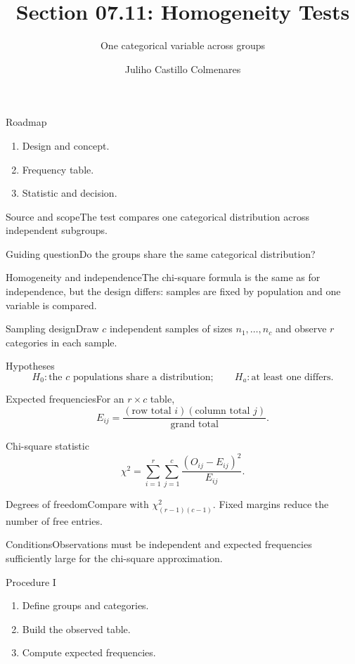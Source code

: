 \documentclass[10pt,aspectratio=169]{beamer}
\title[Homogeneity tests]{Section 07.11: Homogeneity Tests}\subtitle{One categorical variable across groups}
\author[J. Castillo Colmenares]{Juliho Castillo Colmenares}\institute{Tecnológico de Monterrey}\date{}
\begin{document}
\begin{frame}[plain]\titlepage\end{frame}
\begin{frame}{Roadmap}\small\begin{enumerate}\item Design and concept.\item Frequency table.\item Statistic and decision.\end{enumerate}\end{frame}
\begin{frame}{Source and scope}\small The test compares one categorical distribution across independent subgroups.\begin{block}{Guiding question}Do the groups share the same categorical distribution?\end{block}\end{frame}
\begin{frame}{Homogeneity and independence}\small The chi-square formula is the same as for independence, but the design differs: samples are fixed by population and one variable is compared.\end{frame}
\begin{frame}{Sampling design}\small Draw $c$ independent samples of sizes $n_1,\ldots,n_c$ and observe $r$ categories in each sample.\end{frame}
\begin{frame}{Hypotheses}\small\[H_0:\text{the }c\text{ populations share a distribution};\qquad H_a:\text{at least one differs}.\]\end{frame}
\begin{frame}{Expected frequencies}\small For an $r\times c$ table,\[E_{ij}=\frac{(\text{row total }i)(\text{column total }j)}{\text{grand total}}.\]\end{frame}
\begin{frame}{Chi-square statistic}\small\[\chi^2=\sum_{i=1}^{r}\sum_{j=1}^{c}\frac{(O_{ij}-E_{ij})^2}{E_{ij}}.\]\end{frame}
\begin{frame}{Degrees of freedom}\small Compare with $\chi^2_{(r-1)(c-1)}$. Fixed margins reduce the number of free entries.\end{frame}
\begin{frame}{Conditions}\small Observations must be independent and expected frequencies sufficiently large for the chi-square approximation.\end{frame}
\begin{frame}{Procedure I}\small\begin{enumerate}\item Define groups and categories.\item Build the observed table.\item Compute expected frequencies.\end{enumerate}\end{frame}
\end{document}
